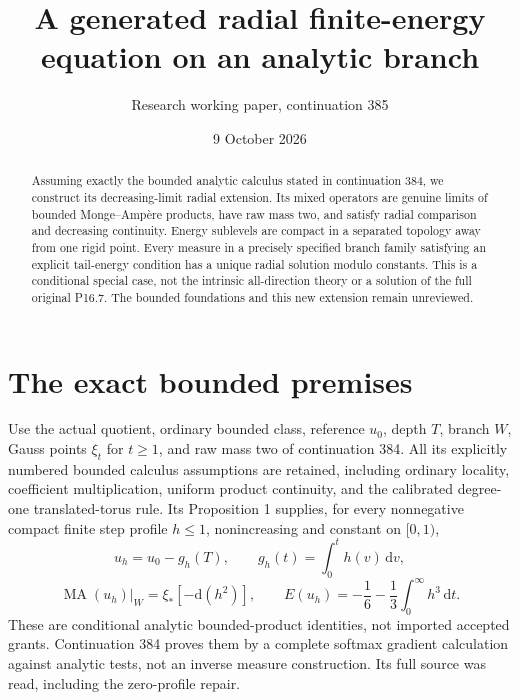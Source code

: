 \documentclass[11pt]{article}
\title{A generated radial finite-energy equation on an analytic branch}
\author{Research working paper, continuation 385}
\date{9 October 2026}
\newcommand{\MA}{\operatorname{MA}}
\begin{document}
\maketitle
\begin{abstract}
Assuming exactly the bounded analytic calculus stated in continuation 384,
we construct its decreasing-limit radial extension. Its mixed operators
are genuine limits of bounded Monge--Amp\`ere products, have raw mass two,
and satisfy radial comparison and decreasing continuity. Energy sublevels
are compact in a separated topology away from one rigid point. Every
measure in a precisely specified branch family satisfying an explicit
tail-energy condition has a unique radial solution modulo constants.
This is a conditional special case, not the intrinsic all-direction
theory or a solution of the full original P16.7. The bounded foundations
and this new extension remain unreviewed.
\end{abstract}

\section{The exact bounded premises}
Use the actual quotient, ordinary bounded class, reference $u_0$, depth
$T$, branch $W$, Gauss points $\xi_t$ for $t\geq1$, and raw mass two
of continuation 384. All its explicitly numbered bounded calculus
assumptions are retained, including ordinary locality, coefficient
multiplication, uniform product continuity, and the calibrated
degree-one translated-torus rule. Its Proposition 1 supplies, for every
nonnegative compact finite step profile $h\leq1$, nonincreasing and
constant on $[0,1)$,
\[
 u_h=u_0-g_h(T),\qquad g_h(t)=\int_0^t h(v)\,\mathrm dv,
\]
\[
 \MA(u_h)|_W=\xi_*[-\mathrm d(h^2)],\qquad
 E(u_h)=-\frac16-\frac13\int_0^\infty h^3\,\mathrm dt.
\]
These are conditional analytic bounded-product identities, not imported
accepted grants. Continuation 384 proves them by a complete softmax
gradient calculation against analytic tests, not an inverse measure
construction. Its full source was read, including the zero-profile repair.
\end{document}
